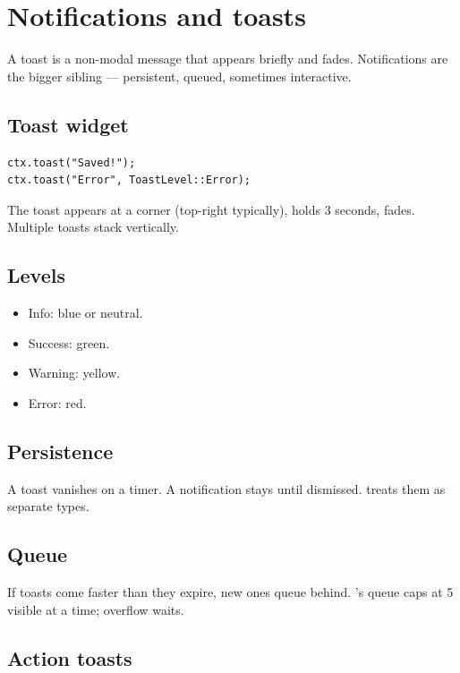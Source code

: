 \chapter{Notifications and toasts}
\label{ch:toasts}

\begin{aside}
A toast is a non-modal message that appears briefly and fades.
Notifications are the bigger sibling --- persistent, queued,
sometimes interactive.
\end{aside}

\section{Toast widget}

\begin{lstlisting}
ctx.toast("Saved!");
ctx.toast("Error", ToastLevel::Error);
\end{lstlisting}

The toast appears at a corner (top-right typically), holds
3 seconds, fades. Multiple toasts stack vertically.

\section{Levels}

\begin{itemize}[leftmargin=*]
  \item Info: blue or neutral.
  \item Success: green.
  \item Warning: yellow.
  \item Error: red.
\end{itemize}

\section{Persistence}

A toast vanishes on a timer. A notification stays until
dismissed. \maya{} treats them as separate types.

\section{Queue}

If toasts come faster than they expire, new ones queue
behind. \maya{}'s queue caps at 5 visible at a time;
overflow waits.

\section{Action toasts}

